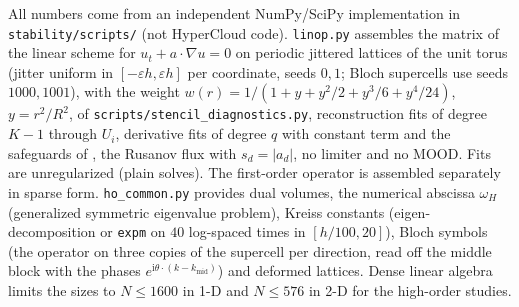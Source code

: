 \documentclass[11pt,a4paper]{article}
\theoremstyle{plain}
\theoremstyle{definition}
\theoremstyle{remark}
\numberwithin{equation}{section}
\newcommand{\ii}{\mathrm{i}}
\newcommand{\A}[1]{\cite[#1]{Addendum}}
\begin{document}
{\sloppy All numbers come from an independent NumPy/SciPy implementation in \texttt{stability/scripts/} (not HyperCloud code). \texttt{linop.py} assembles the matrix of the linear scheme for $u_t+a\cdot\nabla u=0$ on periodic jittered lattices of the unit torus (jitter uniform in $[-\varepsilon h,\varepsilon h]$ per coordinate, seeds $0,1$; Bloch supercells use seeds $1000,1001$), with the weight $w(r)=1/(1+y+y^2/2+y^3/6+y^4/24)$, $y=r^2/R^2$, of \texttt{scripts/stencil\_diagnostics.py}, reconstruction fits of degree $K-1$ through $U_i$, derivative fits of degree $q$ with constant term and the safeguards of \A{Rem.~3.10}, the Rusanov flux with $s_d=|a_d|$, no limiter and no MOOD. Fits are unregularized (plain solves). The first-order operator is assembled separately in sparse form. \texttt{ho\_common.py} provides dual volumes, the numerical abscissa $\omega_H$ (generalized symmetric eigenvalue problem), Kreiss constants (eigen-decomposition or \texttt{expm} on $40$ log-spaced times in $[h/100,20]$), Bloch symbols (the operator on three copies of the supercell per direction, read off the middle block with the phases $e^{\ii\theta\cdot(k-k_{\mathrm{mid}})}$) and deformed lattices. Dense linear algebra limits the sizes to $N\le1600$ in 1-D and $N\le576$ in 2-D for the high-order studies.\par}
\end{document}
